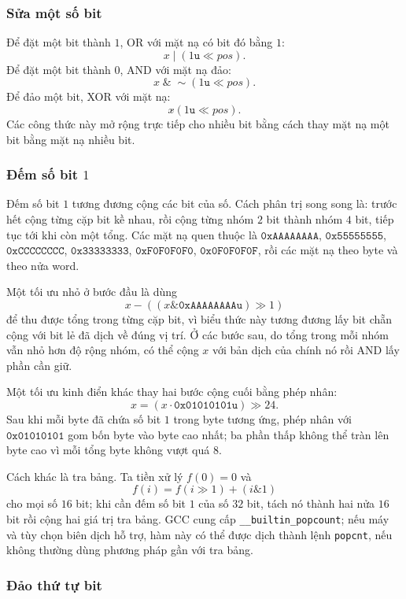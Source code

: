 \documentclass[11pt]{article}
\begin{document}
\subsubsection{Sửa một số bit}

Để đặt một bit thành \(1\), OR với mặt nạ có bit đó bằng \(1\):
\[
  x\;|\;(1\texttt{u}\ll \mathit{pos}).
\]
Để đặt một bit thành \(0\), AND với mặt nạ đảo:
\[
  x\;\&\;\sim(1\texttt{u}\ll \mathit{pos}).
\]
Để đảo một bit, XOR với mặt nạ:
\[
  x\mathbin{\hat{}}(1\texttt{u}\ll \mathit{pos}).
\]
Các công thức này mở rộng trực tiếp cho nhiều bit bằng cách thay mặt nạ một
bit bằng mặt nạ nhiều bit.

\subsubsection{\texorpdfstring{Đếm số bit \(1\)}{Đếm số bit 1}}

Đếm số bit \(1\) tương đương cộng các bit của số. Cách phân trị song song là:
trước hết cộng từng cặp bit kề nhau, rồi cộng từng nhóm \(2\) bit thành nhóm
\(4\) bit, tiếp tục tới khi còn một tổng. Các mặt nạ quen thuộc là
\(\texttt{0xAAAAAAAA}\), \(\texttt{0x55555555}\),
\(\texttt{0xCCCCCCCC}\), \(\texttt{0x33333333}\),
\(\texttt{0xF0F0F0F0}\), \(\texttt{0x0F0F0F0F}\), rồi các mặt nạ theo byte và
theo nửa word.

Một tối ưu nhỏ ở bước đầu là dùng
\[
  x - ((x\&\texttt{0xAAAAAAAAu})\gg 1)
\]
để thu được tổng trong từng cặp bit, vì biểu thức này tương đương lấy bit chẵn
cộng với bit lẻ đã dịch về đúng vị trí. Ở các bước sau, do tổng trong mỗi nhóm
vẫn nhỏ hơn độ rộng nhóm, có thể cộng \(x\) với bản dịch của chính nó rồi AND
lấy phần cần giữ.

Một tối ưu kinh điển khác thay hai bước cộng cuối bằng phép nhân:
\[
  x=(x\cdot \texttt{0x01010101u})\gg 24.
\]
Sau khi mỗi byte đã chứa số bit \(1\) trong byte tương ứng, phép nhân với
\(\texttt{0x01010101}\) gom bốn byte vào byte cao nhất; ba phần thấp không thể
tràn lên byte cao vì mỗi tổng byte không vượt quá \(8\).

Cách khác là tra bảng. Ta tiền xử lý \(f(0)=0\) và
\[
  f(i)=f(i\gg 1)+(i\&1)
\]
cho mọi số \(16\) bit; khi cần đếm số bit \(1\) của số \(32\) bit, tách nó
thành hai nửa \(16\) bit rồi cộng hai giá trị tra bảng. GCC cung cấp
\texttt{\_\_builtin\_popcount}; nếu máy và tùy chọn biên dịch hỗ trợ, hàm này
có thể được dịch thành lệnh \texttt{popcnt}, nếu không thường dùng phương pháp
gần với tra bảng.

\subsubsection{Đảo thứ tự bit}
\end{document}
